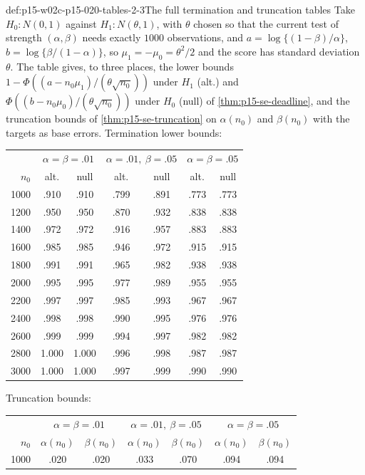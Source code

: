 \begin{hbexample}{def:p15-w02c-p15-020-tables-2-3}{The full termination and truncation tables}
Take \(H_0:N(0,1)\) against \(H_1:N(\theta,1)\), with \(\theta\) chosen
so that the current test of strength \((\alpha,\beta)\) needs exactly
\(1000\) observations, and \(a=\log\{(1-\beta)/\alpha\}\),
\(b=\log\{\beta/(1-\alpha)\}\), so \(\mu_1=-\mu_0=\theta^2/2\) and the
score has standard deviation \(\theta\). The table gives, to three
places, the lower bounds \(1-\Phi((a-n_0\mu_1)/(\theta\sqrt{n_0}))\)
under \(H_1\) (alt.) and \(\Phi((b-n_0\mu_0)/(\theta\sqrt{n_0}))\) under
\(H_0\) (null) of \cref{thm:p15-se-deadline}, and the truncation bounds
of \cref{thm:p15-se-truncation} on \(\alpha(n_0)\) and \(\beta(n_0)\)
with the targets as base errors.
Termination lower bounds:
\begin{center}\small
\begin{tabular}{r|cc|cc|cc}
&\multicolumn{2}{c|}{\(\alpha=\beta=.01\)}&\multicolumn{2}{c|}{\(\alpha=.01,\ \beta=.05\)}&\multicolumn{2}{c}{\(\alpha=\beta=.05\)}\\
\(n_0\)&alt.&null&alt.&null&alt.&null\\\hline
1000&.910&.910&.799&.891&.773&.773\\
1200&.950&.950&.870&.932&.838&.838\\
1400&.972&.972&.916&.957&.883&.883\\
1600&.985&.985&.946&.972&.915&.915\\
1800&.991&.991&.965&.982&.938&.938\\
2000&.995&.995&.977&.989&.955&.955\\
2200&.997&.997&.985&.993&.967&.967\\
2400&.998&.998&.990&.995&.976&.976\\
2600&.999&.999&.994&.997&.982&.982\\
2800&1.000&1.000&.996&.998&.987&.987\\
3000&1.000&1.000&.997&.999&.990&.990
\end{tabular}
\end{center}
Truncation bounds:
\begin{center}\small
\begin{tabular}{r|cc|cc|cc}
&\multicolumn{2}{c|}{\(\alpha=\beta=.01\)}&\multicolumn{2}{c|}{\(\alpha=.01,\ \beta=.05\)}&\multicolumn{2}{c}{\(\alpha=\beta=.05\)}\\
\(n_0\)&\(\alpha(n_0)\)&\(\beta(n_0)\)&\(\alpha(n_0)\)&\(\beta(n_0)\)&\(\alpha(n_0)\)&\(\beta(n_0)\)\\\hline
1000&.020&.020&.033&.070&.094&.094\\

\end{tabular}
\end{center}
\end{hbexample}
